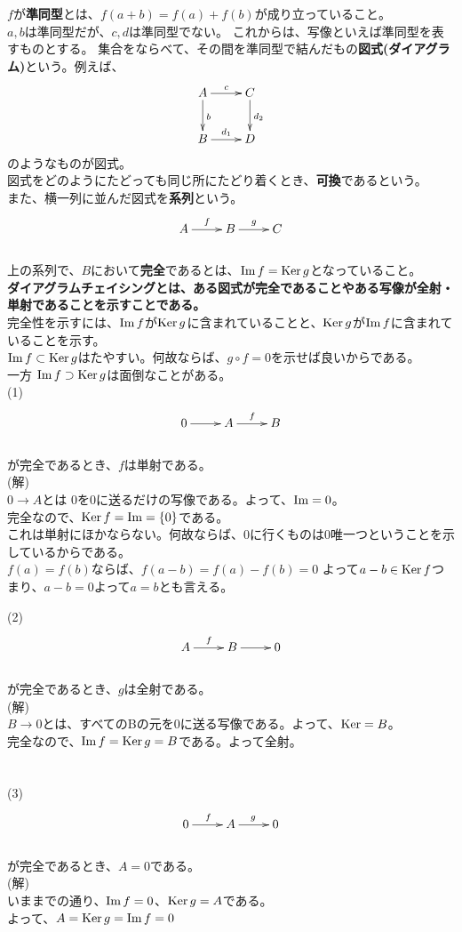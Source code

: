 $f$が\textbf{準同型}とは、$f(a+b) = f(a) + f(b)$が成り立っていること。\\
$a,b$は準同型だが、$c,d$は準同型でない。
これからは、写像といえば準同型を表すものとする。
集合をならべて、その間を準同型で結んだもの\textbf{図式(ダイアグラム)}という。例えば、
\[
\xymatrix
{
A \ar[d]^{b} \ar[r]^{c} 	& C \ar[d]^{d_2}\\
B \ar[r]^{d_1}			& D
}
\]
のようなものが図式。\\
図式をどのようにたどっても同じ所にたどり着くとき、\textbf{可換}であるという。\\
また、横一列に並んだ図式を\textbf{系列}という。\\
\[
\xymatrix{
A \ar[r]^{f} & B \ar[r]^{g} &C  \\
}
\]\\
上の系列で、$B$において\textbf{完全}であるとは、$\mathop{\mathrm{Im}}\nolimits f = \mathop{\mathrm{Ker}}\nolimits g$となっていること。\\
\textbf{ダイアグラムチェイシングとは、ある図式が完全であることやある写像が全射・単射であることを示すことである。}\\
完全性を示すには、$\mathop{\mathrm{Im}}\nolimits f$が$\mathop{\mathrm{Ker}}\nolimits g$に含まれていることと、$\mathop{\mathrm{Ker}}\nolimits g$が$\mathop{\mathrm{Im}}\nolimits f$に含まれていることを示す。\\
$\mathop{\mathrm{Im}}\nolimits f \subset \mathop{\mathrm{Ker}}\nolimits g$はたやすい。何故ならば、$ g \circ f = 0$を示せば良いからである。\\
一方 $\mathop{\mathrm{Im}}\nolimits f \supset \mathop{\mathrm{Ker}}\nolimits g$は面倒なことがある。\\
(1) \[
\xymatrix{
0 \ar[r]^{} & A \ar[r]^{f} &B  \\
}
\]\\
が完全であるとき、$f$は単射である。\\
(解)\\
$ 0 \rightarrow A $とは $0$を$0$に送るだけの写像である。よって、$\mathop{\mathrm{Im}}\nolimits = 0$。\\
完全なので、$ \mathop{\mathrm{Ker}}\nolimits f = \mathop{\mathrm{Im}}\nolimits = \{0\} $である。\\
これは単射にほかならない。何故ならば、0に行くものは0唯一つということを示しているからである。\\
$f(a)=f(b)$ならば、$f(a-b) = f(a)-f(b) = 0$ よって$ a-b \in \mathop{\mathrm{Ker}}\nolimits f$つまり、$a-b=0$よって$a=b$とも言える。

(2) \[
\xymatrix{
A \ar[r]^{f} & B \ar[r]^{} &0  \\
}
\]\\
が完全であるとき、$g$は全射である。\\
(解)\\
$ B \rightarrow 0 $とは、すべてのBの元を$0$に送る写像である。よって、$\mathop{\mathrm{Ker}}\nolimits = B$。\\
完全なので、$ \mathop{\mathrm{Im}}\nolimits f = \mathop{\mathrm{Ker}}\nolimits g = B $である。よって全射。\\
   　　　\\
　　\\
(3) \[
\xymatrix{
0 \ar[r]^{f} & A \ar[r]^{g} &0  \\
}
\]\\
が完全であるとき、$A=0$である。\\
(解)\\
いままでの通り、$\mathop{\mathrm{Im}}\nolimits f = 0$、$\mathop{\mathrm{Ker}}\nolimits g = A$である。\\
よって、$A = \mathop{\mathrm{Ker}}\nolimits g = \mathop{\mathrm{Im}}\nolimits f = 0$

